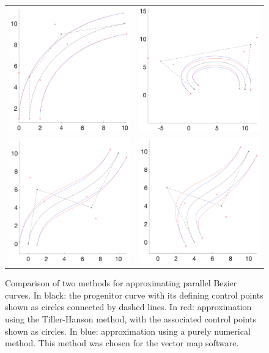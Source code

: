 \documentclass[12pt,twoside]{article}
\begin{document}
\begin{figure}
\centering
\begin{tabular}{cc}
  \includegraphics[width=60mm]{b1.png} &   \includegraphics[width=60mm]{b2.png} \\
 \includegraphics[width=60mm]{b3.png} &   \includegraphics[width=60mm]{b4.png}
\end{tabular}
\caption{Comparison of two methods for approximating parallel Bezier curves. In black: the progenitor curve with its defining control points shown as circles connected by dashed lines. In red: approximation using the Tiller-Hanson method, with the associated control points shown as circles. In blue: approximation using a purely numerical method. This method was chosen for the vector map software.}
\label{fig:approx}
\end{figure}
\end{document}
